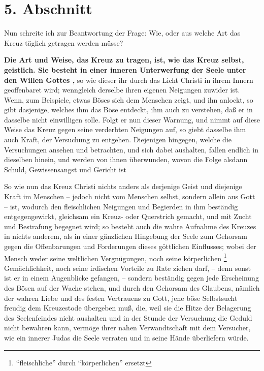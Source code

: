 \section{5. Abschnitt} \label{kap3_ab5} 

Nun schreite ich zur Beantwortung der Frage: Wie, oder aus welche Art das Kreuz
täglich getragen werden müsse?

\medskip

\textbf{Die Art und Weise, das Kreuz zu tragen, ist, wie das Kreuz selbst,
geistlich.
Sie besteht in einer inneren Unterwerfung der Seele unter den Willen Gottes ,} so
wie dieser ihr durch das Licht Christi in ihrem Innern geoffenbaret wird;
wenngleich derselbe ihren eigenen Neigungen zuwider ist. Wenn, zum Beispiele,
etwas Böses sich dem Menschen zeigt, und ihn anlockt, so gibt dasjenige,
welches ihm das Böse entdeckt, ihm auch zu verstehen, daß er in dasselbe nicht
einwilligen solle. Folgt er nun dieser Warnung, und nimmt auf %
 diese Weise das
Kreuz gegen seine verderbten Neigungen auf, so giebt dasselbe ihm auch Kraft,
der Versuchung zu entgehen. Diejenigen hingegen, welche die Versuchungen ansehen
und betrachten, und sich dabei aushalten, fallen endlich in dieselben hinein,
und werden von ihnen überwunden, wovon die Folge alsdann Schuld, Gewissensangst
und Gericht ist

\medskip

So wie nun das Kreuz Christi nichts anders als derjenige Geist und diejenige
Kraft im Menschen -- jedoch nicht vom Menschen selbst, sondern allein aus Gott --
ist, wodurch den fleischlichen Neigungen und Begierden in ihm beständig
entgegengewirkt, gleichsam ein Kreuz- oder Querstrich gemacht, und mit Zucht und
Bestrafung begegnet wird; so besteht auch die wahre Aufnahme des Kreuzes in
nichts anderem, als in einer gänzlichen Hingebung der Seele zum Gehorsam gegen
die Offenbarungen und Forderungen dieses göttlichen Einflusses; wobei der Mensch
weder seine weltlichen Vergnügungen, noch seine körperlichen \footnote{"`fleischliche"' durch "`körperlichen"' ersetzt} Gemächlichkeit,
noch seine irdischen Vorteile zu Rate ziehen darf, -- denn sonst ist er in
einem Augenblicke gefangen, -- sondern beständig gegen jede Erscheinung des
Bösen auf der Wache stehen, und durch den Gehorsam des Glaubens, nämlich der
wahren Liebe und des festen Vertrauens zu Gott, jene böse Selbstsucht freudig
dem Kreuzestode übergeben muß, die, weil sie die Hitze der Belagerung des
Seelenfeindes nicht aushalten und in der Stunde der Versuchung die Geduld nicht
bewahren kann, vermöge ihrer nahen Verwandtschaft mit dem Versucher, wie ein
innerer Judas die Seele verraten und in seine Hände überliefern würde.



